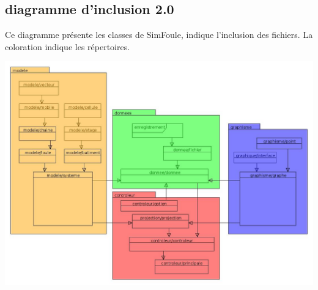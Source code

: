 \subsection{diagramme d'inclusion 2.0}
%
Ce diagramme présente les classes de SimFoule, indique l'inclusion des fichiers. La coloration indique les répertoires.
%
\begin{center}
\includegraphics[scale=0.45]{./illustration/classesSimFoule}
\end{center}
%

%
\newpage
%
